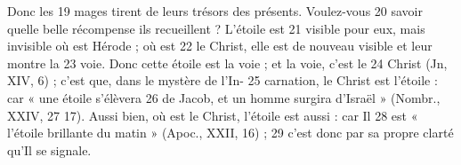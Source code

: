 Donc les	 
19	 	mages tirent de leurs trésors des présents. Voulez-vous	 
20	 	savoir quelle belle récompense ils recueillent ? L'étoile est	 
21	 	visible pour eux, mais invisible où est Hérode ; où est	 
22	 	le Christ, elle est de nouveau visible et leur montre la	 
23	 	voie. Donc cette étoile est la voie ; et la voie, c'est le	 
24	 	Christ (Jn, XIV, 6) ; c'est que, dans le mystère de l'In-	 
25	 	carnation, le Christ est l'étoile : car « une étoile s'élèvera	 
26	 	de Jacob, et un homme surgira d'Israël » (Nombr., XXIV,	 
27	 	17). Aussi bien, où est le Christ, l'étoile est aussi : car Il	 
28	 	est « l'étoile brillante du matin » (Apoc., XXII, 16) ;	 
29	 	c'est donc par sa propre clarté qu'Il se signale.